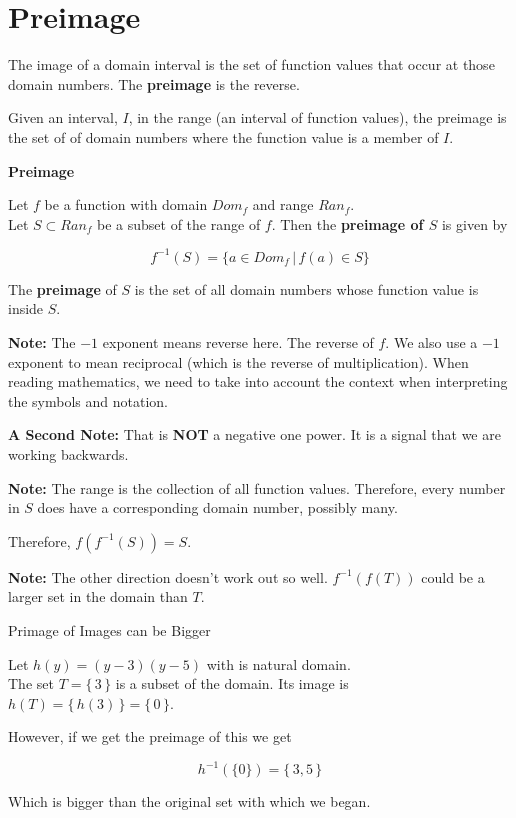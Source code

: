 \documentclass{ximera}
\begin{document}
\section*{Preimage}




The image of a domain interval is the set of function values that occur at those domain numbers.  The \textbf{preimage} is the reverse.  

Given an interval, $I$, in the range (an interval of function values), the preimage is the set of of domain numbers where the function value is a member of $I$.





\begin{definition} \textbf{\textcolor{green!50!black}{Preimage}}

Let $f$ be a function with domain $Dom_f$ and range $Ran_f$. \\
Let $S \subset Ran_f$ be a subset of the range of $f$.  Then the \textbf{preimage of $S$} is given by

\[       f^{-1}(S) = \{   a \in Dom_f  \, | \, f(a) \in S  \}             \]



The \textbf{preimage} of $S$ is the set of all domain numbers whose function value is inside $S$.


\textbf{Note:}  The $-1$ exponent means reverse here. The reverse of $f$.  We also use a $-1$ exponent to mean reciprocal (which is the reverse of multiplication).  When reading mathematics, we need to take into account the context when interpreting the symbols and notation.


\end{definition}

\textbf{A Second Note:} That is \textbf{NOT} a negative one power.  It is a signal that we are working backwards.

\textbf{Note:}  The range is the collection of all function values. Therefore, every number in $S$ does have a corresponding domain number, possibly many.

Therefore, $f(f^{-1}(S)) = S$.


\textbf{Note:}  The other direction doesn't work out so well. $f^{-1}(f(T))$ could be a larger set in the domain than $T$.



\begin{example} Primage of Images can be Bigger


Let $h(y) = (y-3)(y-5)$ with is natural domain. \\

The set $T = \{ \, 3 \, \}$ is a subset of the domain.  Its image is $h(T) = \{ \, h(3) \, \} = \{ \, 0 \, \}$.

However, if we get the preimage of this we get


\[
h^{-1}(\{ 0 \}) = \{ \,  3, 5 \,\}
\]

Which is bigger than the original set with which we began.

\end{example}
\end{document}

